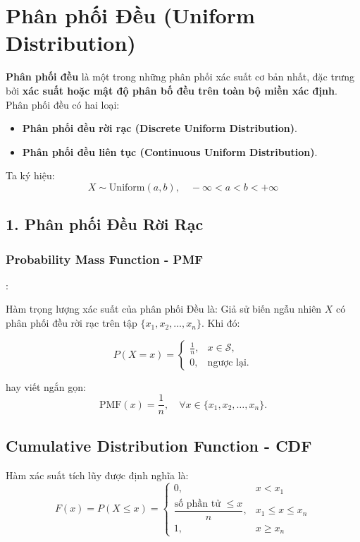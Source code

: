 \section{Phân phối Đều (Uniform Distribution)}

\textbf{Phân phối đều} là một trong những phân phối xác suất cơ bản nhất, đặc trưng bởi \textbf{xác suất hoặc mật độ phân bố đều trên toàn bộ miền xác định}.  
Phân phối đều có hai loại:
\begin{itemize}
    \item \textbf{Phân phối đều rời rạc (Discrete Uniform Distribution)}.
    \item \textbf{Phân phối đều liên tục (Continuous Uniform Distribution)}.
\end{itemize}

Ta ký hiệu:
\[
X \sim \mathrm{Uniform}(a, b), \quad -\infty < a < b < +\infty
\]

\subsection{1. Phân phối Đều Rời Rạc}

\subsubsection{Probability Mass Function - PMF}:

Hàm trọng lượng xác suất của phân phối Đều là:
Giả sử biến ngẫu nhiên \( X \) có phân phối đều rời rạc trên tập \( \{x_1, x_2, \ldots, x_n\} \). Khi đó:

\[
P(X = x) =
\begin{cases}
\displaystyle \frac{1}{n}, & x \in \mathcal{S}, \\[1em]
0, & \text{ngược lại}.
\end{cases}
\]

hay viết ngắn gọn:
\[
\mathrm{PMF}(x) = \frac{1}{n}, \quad \forall x \in \{x_1, x_2, \ldots, x_n\}.
\]

\subsection{Cumulative Distribution Function - CDF}

Hàm xác suất tích lũy được định nghĩa là:
\[
F(x) = P(X \le x) =
\begin{cases}
0, & x < x_1 \\[0.5em]
\dfrac{\text{số phần tử } \le x}{n}, & x_1 \le x \le x_n \\[0.8em]
1, & x \ge x_n
\end{cases}
\]
  
